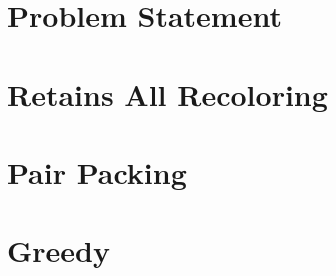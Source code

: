\documentclass{beamer}
\begin{document}


\section{Problem Statement}



\section{Retains All Recoloring}





\section{Pair Packing}




\section{Greedy}



\end{document}
